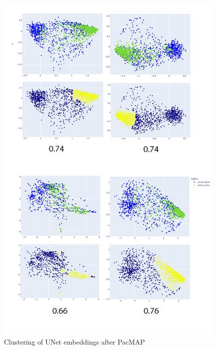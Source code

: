 \begin{figure}[htb]
	\begin{center}
		\includegraphics[width=\linewidth]{bilder/unet-embeddings/PacMAP.png}
		\caption{Clustering of UNet embeddings after PacMAP}\label{fig:unet-clustering}
	\end{center}
\end{figure}

